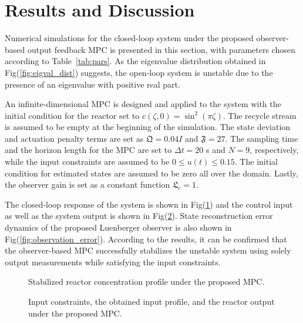 \section{Results and Discussion}

Numerical simulations for the closed-loop system under the proposed observer-based output feedback MPC is presented in this section, with parameters chosen according to Table~\ref{tab:pars}. As the eigenvalue distribution obtained in Fig(\ref{fig:eigval_dist}) suggests, the open-loop system is unstable due to the presence of an eigenvalue with positive real part. 

An infinite-dimensional MPC is designed and applied to the system with the initial condition for the reactor set to $c(\zeta,0) = \sin^2(\pi \zeta)$. The recycle stream is assumed to be empty at the beginning of the simulation. The state deviation and actuation penalty terms are set as $\mathfrak{Q} = 0.04 I$ and $\mathfrak{F} = 27$. The sampling time and the horizon length for the MPC are set to $\Delta t = 20$ s and $N = 9$, respectively, while the input constraints are assumed to be $0 \leq u(t) \leq 0.15$. The initial condition for estimated states are assumed to be zero all over the domain. Lastly, the observer gain is set as a constant function $\mathfrak{L}_c = 1$. 

The closed-loop response of the system is shown in Fig(\ref{fig:closedloop_response}) and the control input as well as the system output is shown in Fig(\ref{fig:control_input}). State reconstruction error dynamics of the proposed Luenberger observer is also shown in Fig(\ref{fig:observation_error}). According to the results, it can be confirmed that the observer-based MPC successfully stabilizes the unstable system using solely output measurements while satisfying the input constraints.

\begin{figure}[!htbp]
    \centering
    
    \caption{Stabilized reactor concentration profile under the proposed MPC.}
    \label{fig:closedloop_response}
\end{figure}

\begin{figure}[!htbp]
    \centering
    
    \caption{Input constraints, the obtained input profile, and the reactor output under the proposed MPC.}
    \label{fig:control_input}
\end{figure}

